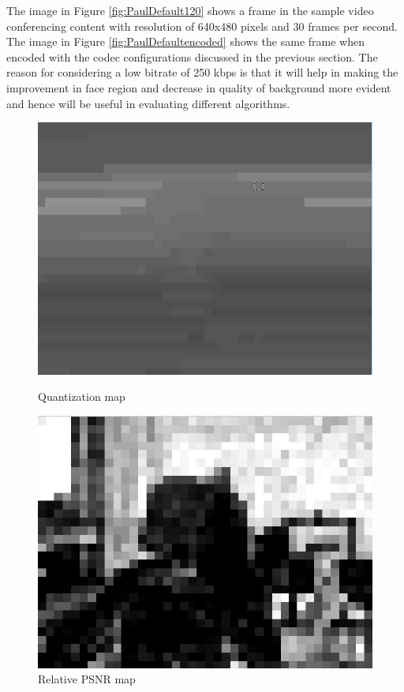 \documentclass[11pt]{article} %
\begin{document}
The image in Figure \ref{fig:PaulDefault120} shows a frame in the sample video conferencing content with resolution of 640x480 pixels and 30 frames per second. The image in Figure \ref{fig:PaulDefaultencoded} shows the same frame when encoded with the codec configurations discussed in the previous section. The reason for considering a low bitrate of 250 kbps is that it will help in making the improvement in face region and decrease in quality of background more evident and hence will be useful in evaluating different algorithms. 

\begin{figure}[!h]
    \centering
    \includegraphics[scale=0.5]{PaulDefault120_91250kbps_quant}
    \caption{Quantization map}
    \label{fig:PaulDefault120Quant}
    \includegraphics[scale=0.5]{PaulDefault120_91250kbps_psnr}
    \caption{Relative PSNR map}
    \label{fig:PaulDefault120PSNR}
\end{figure} 
\end{document}
